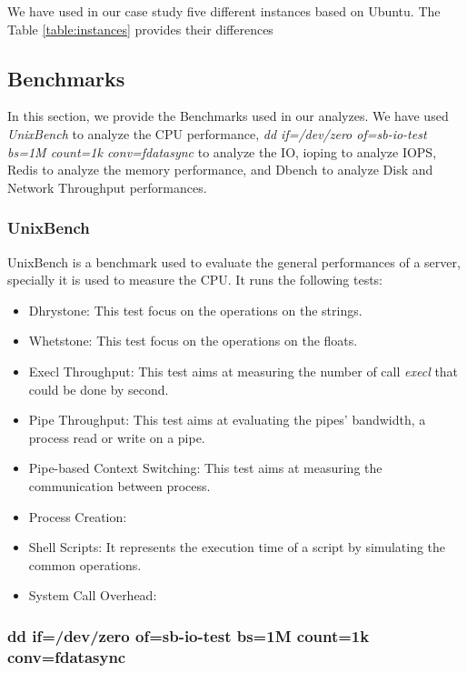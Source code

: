 \documentclass[10pt, conference]{IEEEtran}
\begin{document}
We have used in our case study five different instances based on Ubuntu. The Table \ref{table:instances} provides their differences 





\subsection{Benchmarks}

In this section, we provide the Benchmarks used in our analyzes. We have used \textit{UnixBench} to analyze the CPU performance, \textit{dd if=/dev/zero of=sb-io-test bs=1M count=1k conv=fdatasync} to analyze the IO, ioping to analyze IOPS, Redis to analyze the memory performance, and Dbench to analyze Disk and Network Throughput performances. 

\subsubsection{UnixBench}


UnixBench is a benchmark used to evaluate the general performances of a server, specially it is used to measure the CPU. It runs the following tests:

\begin{itemize}

\item Dhrystone: This test focus on the operations on the strings.
\item Whetstone: This test focus on the operations on the floats.
\item Execl Throughput: This test aims at measuring the number of call \textit{execl} that could be done by second.
\item Pipe Throughput: This test aims at evaluating the pipes' bandwidth, a process read or write on a pipe.
\item Pipe-based Context Switching: This test aims at measuring the communication between process.
\item Process Creation: 
\item Shell Scripts: It represents the execution time of a script by simulating the common operations. 
\item System Call Overhead: 

\end{itemize}

\subsubsection{dd if=/dev/zero of=sb-io-test bs=1M count=1k conv=fdatasync}
\end{document}
